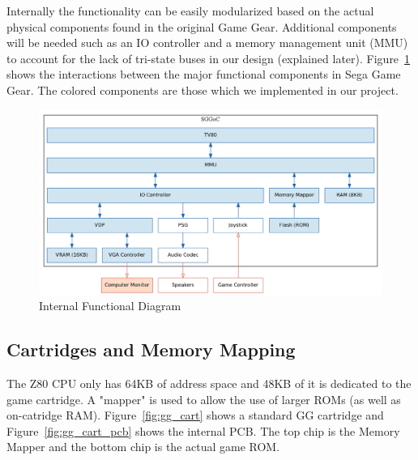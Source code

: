 \documentclass{article}
\begin{document}
Internally the functionality can be easily modularized based on the actual
physical components found in the original Game Gear. Additional components will
be needed such as an IO controller and a memory management unit (MMU) to
account for the lack of tri-state buses in our design (explained later).
Figure~\ref{fig:internal} shows the interactions between the major functional
components in Sega Game Gear. The colored components are those which we
implemented in our project.

\begin{figure}[H]
\centering
\includegraphics[scale=0.4]{../block_diagrams/block_diagram_internal_implemented.png}
\caption{Internal Functional Diagram}
\label{fig:internal}
\end{figure}

\newpage
\subsection{Cartridges and Memory Mapping}
The Z80 CPU only has 64KB of address space and 48KB of it is dedicated to the
game cartridge. A "mapper" is used to allow the use of larger ROMs (as well as
on-catridge RAM). Figure~\ref{fig:gg_cart} shows a standard GG cartridge and
Figure~\ref{fig:gg_cart_pcb} shows the internal PCB. The top chip is the Memory
Mapper and the bottom chip is the actual game ROM.
\end{document}
